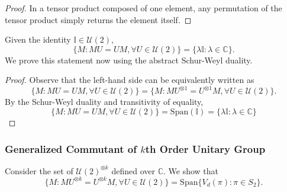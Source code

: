 \begin{proof}
    In a tensor product composed of one element, any permutation of the tensor product simply returns the element itself.
\end{proof}

\begin{theorem}
    Given the identity $\mathbb{I} \in \mathcal{U}(2)$,
    \begin{equation}
        \{M : M U = U M, \forall U \in \mathcal{U}(2) \} = \{\lambda \mathbb{I} : \lambda \in \mathbb{C} \}.
    \end{equation}
    We prove this statement now using the abstract Schur-Weyl duality.
\end{theorem}

\begin{proof}
    Observe that the left-hand side can be equivalently written as
    \begin{equation}
        \{M : MU = UM, \forall U \in \mathcal{U}(2) \} = \{M : MU^{\otimes 1} = U^{\otimes 1} M, \forall U \in \mathcal{U}(2) \}.
    \end{equation}
    By the Schur-Weyl duality and transitivity of equality,
    \begin{equation}
        \{M : MU = UM, \forall U \in \mathcal{U}(2) \} = \text{Span}(\mathbb{I}) = \{ \lambda \mathbb{I} : \lambda \in \mathbb{C} \}
    \end{equation}
\end{proof}

\subsubsection{Generalized Commutant of $k$th Order Unitary Group}
\begin{theorem}
    Consider the set of $\mathcal{U}(2)^{\otimes k}$ defined over $\mathbb{C}$. We show that
    \begin{equation}
        \{ M : M U^{\otimes k} = U^{\otimes k} M, \forall U \in \mathcal{U}(2) \} = \text{Span}\{V_{d}(\pi) : \pi \in S_{2} \}.
    \end{equation}
\end{theorem}
